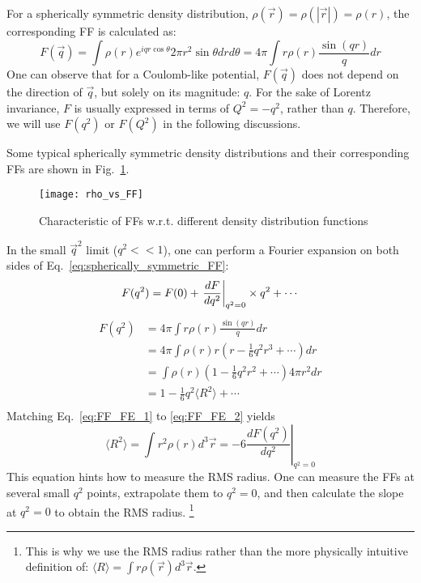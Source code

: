 For a spherically symmetric density distribution, 
$\rho(\vec{r}) = \rho({|\vec{r}|}) = \rho(r)$, 
the corresponding FF is calculated as:
\begin{equation}
    F(\vec{q}) = \int \rho(r) e^{iqr\cos\theta} 2\pi r^2 \sin\theta dr d\theta
	= 4\pi \int r \rho(r) \frac{\sin{(qr)}}{q} dr
    \label{eq:spherically_symmetric_FF}
\end{equation}
One can observe that for a Coulomb-like potential, $F(\vec{q})$ does not depend on
the direction of $\vec{q}$, but solely on its magnitude: $q$. For the sake 
of Lorentz invariance, $F$ is usually expressed in terms of $Q^2 = -q^2$, rather
than $q$. Therefore, we will use $F(q^2)$ or $F(Q^2)$ in the following discussions.

Some typical spherically symmetric density distributions and their 
corresponding FFs are shown in Fig.~\ref{fig:FFs}.
\begin{figure}[!h]
    \texttt{[image: rho\_vs\_FF]}
    \caption{Characteristic of FFs w.r.t. different density distribution functions}
    \label{fig:FFs}
\end{figure}

In the small $\vec{q}^2$ limit ($q^2 << 1$), one can perform a Fourier expansion on both
sides of Eq.~\ref{eq:spherically_symmetric_FF}:
\begin{equation}
    F(q^2) = F(0) + \left.\frac{dF}{dq^2}\right|_{q^2=0} \times q^2 + \cdots	\\
    \label{eq:FF_FE_1}
\end{equation}
\begin{equation}
    \begin{aligned}
	F(q^2) &= 4\pi \int r \rho(r) \frac{\sin{(qr)}}{q} dr \\
	    &= 4\pi \int \rho(r) r \left( r - \frac{1}{6} q^2r^3 + \cdots \right) dr	\\
	    &= \int \rho(r)  \left( 1 - \frac{1}{6} q^2r^2 + \cdots \right) 4\pi r^2 dr	\\
	    &= 1 - \frac{1}{6}q^2\langle R^2 \rangle + \cdots \\
    \end{aligned}
    \label{eq:FF_FE_2}
\end{equation}
Matching Eq.~\ref{eq:FF_FE_1} to \ref{eq:FF_FE_2} yields
\begin{equation}
    \langle R^2 \rangle = \int r^2 \rho(r) d^3\vec{r} = -6 \left. \frac{dF(q^2)}{dq^2} \right|_{q^2 = 0}
\end{equation}
This equation hints how to measure the RMS radius.
One can measure the FFs at several small $q^2$ points, extrapolate them 
to $q^2 = 0$, and then calculate the slope at $q^2 = 0$ to obtain the RMS radius.
\footnote{This is why we use the RMS radius rather than the more physically intuitive definition of: 
$\langle R \rangle = \int  r \rho(\vec{r}) d^3\vec{r}$.}

